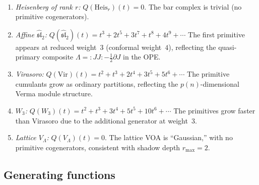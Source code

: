 \begin{computation}
\ \\[-1em]
\begin{enumerate}[leftmargin=2.4em]
\item \emph{Heisenberg of rank $r$:}
$Q(\mathrm{Heis}_r)(t) = 0$.
The bar complex is trivial (no primitive cogenerators).

\item \emph{Affine $\widehat{\mathfrak{sl}}_2$:}
$Q(\widehat{\mathfrak{sl}}_2)(t) = t^3 + 2t^5 + 3t^7 + t^8 + 4t^9 + \cdots$
The first primitive appears at reduced weight~$3$ (conformal weight~$4$),
reflecting the quasi-primary composite $\Lambda = {:}JJ{:} -
\frac{1}{2}\partial J$ in the OPE.

\item \emph{Virasoro:}
$Q(\mathrm{Vir})(t) = t^2 + t^3 + 2t^4 + 3t^5 + 5t^6 + \cdots$
The primitive cumulants grow as ordinary partitions, reflecting the
$p(n)$-dimensional Verma module structure.

\item \emph{$W_3$:}
$Q(W_3)(t) = t^2 + t^3 + 3t^4 + 5t^5 + 10t^6 + \cdots$
The primitives grow faster than Virasoro due to the additional
generator at weight~$3$.

\item \emph{Lattice $V_\Lambda$:}
$Q(V_\Lambda)(t) = 0$.
The lattice VOA is ``Gaussian,'' with no primitive cogenerators,
consistent with shadow depth $r_{\max} = 2$.
\end{enumerate}
\end{computation}

\subsection{Generating functions}

